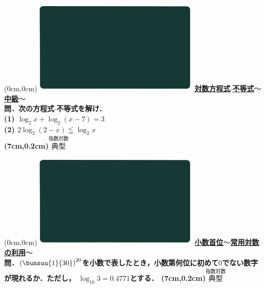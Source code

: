 \documentclass[10pt,
fleqn,
dvipdfmx,
uplatex
]{jsarticle}
\begin{document}
\newpage



\at(0cm,0cm){\includegraphics[width=8cm,bb=0 0 1920 1080]{./media_local/smart_background/指数対数.jpeg}}
{\color{orange}\bf\boldmath\Large\underline{対数方程式$\cdot$不等式$〜$中級$〜$}}\vspace{0.3zw}\\
\Large 
\bf\boldmath 問．次の方程式$\cdot$不等式を解け．\\
(1)  $\log _2x+\log _2\left(x-7\right)=3$\\
(2)  $2\log _2\left(2-x\right)\leqq \log _2x$\\

\at(7cm,0.2cm){\small\color{bradorange}$\overset{\text{指数対数}}{\text{典型}}$}


\newpage



\at(0cm,0cm){\includegraphics[width=8cm,bb=0 0 1920 1080]{./media_local/smart_background/指数対数.jpeg}}
{\color{orange}\bf\boldmath\Large\underline{小数首位$〜$常用対数の利用$〜$}}\vspace{0zw}\\
\Large 
\bf\boldmath 問．$\left(\bunsuu{1}{{}30}\right)^{20}$を小数で表したとき，小数第何位に初めて$0$でない数字が現れるか．ただし，
$\log _{10}3=0.{4771}$とする．
\at(7cm,0.2cm){\small\color{bradorange}$\overset{\text{指数対数}}{\text{典型}}$}


\newpage
\end{document}
